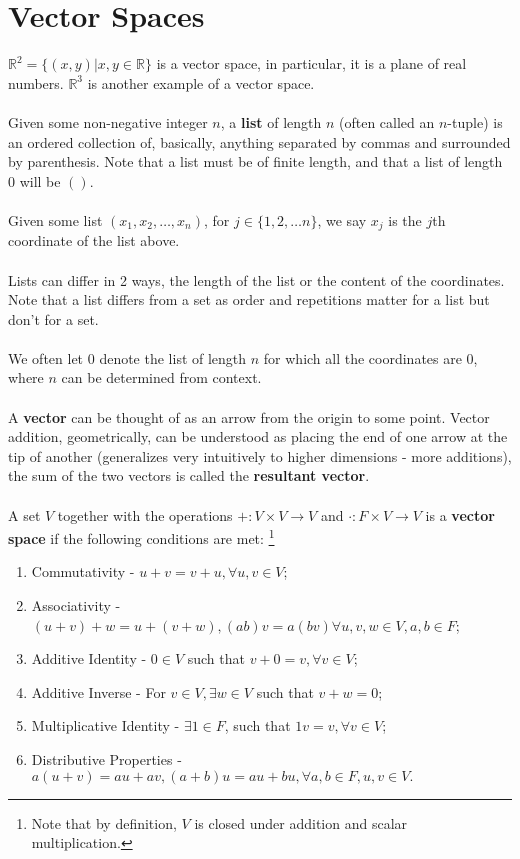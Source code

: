 \documentclass{article}
\theoremstyle{definition}
\begin{document}
\section{Vector Spaces}
${\mathbb{R}}^2 = \{(x, y)|x, y \in \mathbb{R}\}$ is a vector space, in particular, it is a plane of real numbers. ${\mathbb{R}}^3$ is another example of a vector space. \\ \\
Given some non-negative integer $n$, a \textbf{list} of length $n$ (often called an $n$-tuple) is an ordered collection of, basically, anything separated by commas and surrounded by parenthesis. Note that a list must be of finite length, and that a list of length 0 will be $()$. \\ \\
Given some list $(x_1, x_2, \dots, x_n)$, for $j \in \{1, 2, \dots n\}$, we say $x_j$ is the $j$th coordinate of the list above. \\ \\
Lists can differ in 2 ways, the length of the list or the content of the coordinates. Note that a list differs from a set as order and repetitions matter for a list but don't for a set. \\ \\
We often let $0$ denote the list of length $n$ for which all the coordinates are $0$, where $n$ can be determined from context. \\ \\
A \textbf{vector} can be thought of as an arrow from the origin to some point. Vector addition, geometrically, can be understood as placing the end of one arrow at the tip of another (generalizes very intuitively to higher dimensions - more additions), the sum of the two vectors is called the \textbf{resultant vector}. \\ \\
A set $V$ together with the operations $+: V \times V \rightarrow V$ and $\cdot : F \times V \rightarrow V$ is a \textbf{vector space} if the following conditions are met: \footnote{Note that by definition, $V$ is closed under addition and scalar multiplication.}
\begin{enumerate}
\item Commutativity - $u + v = v + u, \forall u, v \in V$;
\item Associativity - $(u+v)+w =u+(v+w), (ab)v =a(bv) \forall u,v,w \in V, a, b \in F$;
\item Additive Identity - $0 \in V$ such that $v + 0 = v, \forall v \in V$;
\item Additive Inverse - For $v \in V, \exists w \in V$ such that $v + w = 0$; 
\item Multiplicative Identity - $\exists 1 \in F$, such that $1v =v, \forall v \in V$;
\item Distributive Properties - $a(u + v) = au + av, (a + b)u = au + bu, \forall a, b \in F, u, v \in V.$
\end{enumerate}
\end{document}
